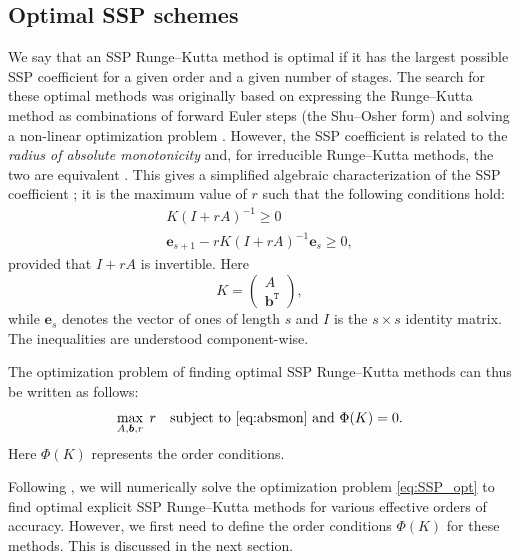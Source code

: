 \documentclass{siamltex}  %
\begin{document}
\subsection{Optimal SSP schemes}\label{subsec:Optimal_SSPRK}
We say that an SSP Runge--Kutta method is optimal if it has the largest 
possible SSP coefficient for a given order and a given number of stages.
The search for these optimal methods was originally based on
expressing the Runge--Kutta method as combinations of forward Euler
steps (the Shu--Osher form) and solving a non-linear optimization
problem \cite{Gottlieb/Shu:1998, Gottlieb2001, Spiteri2003a, Spiteri2003b, 
Ruuth2004, Ruuth:2006}.
However, the SSP coefficient is related to the 
\emph{radius of absolute monotonicity} \cite{Kraaijevanger1991} and, 
for irreducible Runge--Kutta methods, the two are equivalent 
\cite{Ferracina2004, Higueras2004}.
This gives a simplified algebraic characterization of the SSP coefficient
\cite{Ferracina2005}; it is the maximum value of $r$ such that the following
conditions hold:
\begin{subequations} \label{eq:absmon}
\begin{align}
    K(I + rA)^{-1} \geq 0 \\
    \bm{e}_{s+1} - rK(I + rA)^{-1}\bm{e}_{s} \geq 0,
\end{align}
\end{subequations}
provided that $I + rA$ is invertible.
Here
\begin{equation*}
    K = \left(
            \begin{array}{c}
                     A              \\
                     \bm{b}^{\texttt{T}}
            \end{array}
         \right),
\end{equation*}
while $\bm{e}_s$ denotes the vector of ones of length $s$ and $I$ is the
$s \times s$ identity matrix.
The inequalities are understood component-wise.

The optimization problem of finding optimal SSP Runge--Kutta methods
can thus be written as follows:
\begin{equation}\label{eq:SSP_opt}
    \max_{A, \bm{b}, r} \; r \quad \text{subject to \eqref{eq:absmon} and } \Phi(K) = 0.
\end{equation}
Here \( \Phi(K) \) represents the  order conditions.

Following \cite{Ketcheson2008, Ketcheson/Macdonald/Gottlieb:2009}, 
we will numerically solve the optimization problem \eqref{eq:SSP_opt} to find
optimal explicit SSP Runge--Kutta methods for various effective orders of accuracy.
However, we first need to define the order conditions $\Phi(K)$ for these methods.
This is discussed in the next section.
\end{document}
